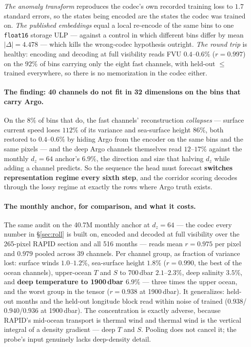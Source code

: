 \documentclass[10pt]{article}
\begin{document}
\emph{The anomaly transform} reproduces the codec's own recorded training
loss to $1.7$ standard errors, so the states being encoded are the states
the codec was trained on. \emph{The published embeddings} equal a local
re-encode of the same bins to one \texttt{float16} storage ULP --- against a
control in which different bins differ by mean $|\Delta| = 4.478$ --- which
kills the wrong-codec hypothesis outright. \emph{The round trip} is
healthy: encoding and decoding at full visibility reads FVU $0.4$--$0.6\%$
($r = 0.997$) on the $92\%$ of bins carrying only the eight fast channels,
with held-out $\le$ trained everywhere, so there is no memorization in the
codec either.

\paragraph{The finding: 40 channels do not fit in 32 dimensions on the bins
that carry Argo.} On the $8\%$ of bins that do, the fast channels'
reconstruction \emph{collapses} --- surface current speed loses $112\%$ of
its variance and sea-surface height $86\%$, both restored to $0.4$--$0.6\%$
by hiding Argo from the encoder on the same bins and the same pixels --- and
the deep Argo channels themselves read $12$--$17\%$ against the monthly
$d_z{=}64$ anchor's $6.9\%$, the direction and size that halving $d_z$ while
adding a channel predicts. So the sequence the head must forecast
\textbf{switches representation regime every sixth step}, and the corridor
scoring decodes through the lossy regime at exactly the rows where Argo
truth exists.

\paragraph{The monthly anchor, for comparison, and what it costs.} The same
audit on the 40.7M monthly anchor at $d_z{=}64$ --- the codec every number
in \S\ref{sec:roll} is built on, encoded and decoded at full visibility over
the 265-pixel RAPID section and all 516 months --- reads mean $r = 0.975$
per pixel and $0.979$ pooled across 39 channels. Per channel group, as
fraction of variance lost: surface winds $1.0$--$1.2\%$, sea-surface height
$1.8\%$ ($r=0.990$, the best of the ocean channels), upper-ocean $T$ and $S$
to 700\,dbar $2.1$--$2.3\%$, deep salinity $3.5\%$, and \textbf{deep
temperature to 1900\,dbar $6.9\%$} --- three times the upper ocean, and the
worst group in the tensor ($r=0.938$ at 1900\,dbar). It generalizes: held-out
months and the held-out longitude block read within noise of trained
($0.938$/$0.940$/$0.936$ at 1900\,dbar). The concentration is exactly
adverse, because RAPID's mid-ocean transport is thermal wind and thermal
wind is the vertical integral of a density gradient --- deep $T$ and $S$.
Pooling does not cancel it; the probe's input genuinely lacks deep-density
detail.
\end{document}
